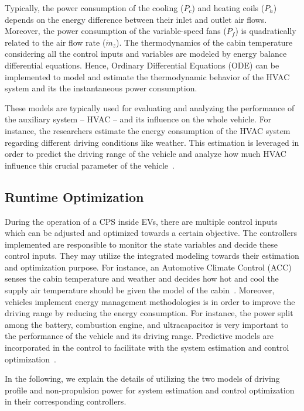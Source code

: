 Typically, the power consumption of the cooling ($P_c$) and heating coils ($P_h$) depends on the energy difference between their inlet and outlet air flows. Moreover, the power consumption of the variable-speed fans ($P_f$) is quadratically related to the air flow rate ($\dot{m}_z$). The thermodynamics of the cabin temperature considering all the control inputs and variables are modeled by energy balance differential equations. Hence, Ordinary Differential Equations (ODE) can be implemented to model and estimate the thermodynamic behavior of the HVAC system and its the instantaneous power consumption. 

These models are typically used for evaluating and analyzing the performance of the auxiliary system – HVAC – and its influence on the whole vehicle. For instance, the researchers estimate the energy consumption of the HVAC system regarding different driving conditions like weather. This estimation is leveraged in order to predict the driving range of the vehicle and analyze how much HVAC influence this crucial parameter of the vehicle~\cite{AF_23,AF_28,AF_29}. 

\subsection{Runtime Optimization}

During the operation of a CPS inside EVs, there are multiple control inputs which can be adjusted and optimized towards a certain objective. The controllers implemented are responsible to monitor the state variables and decide these control inputs. They may utilize the integrated modeling towards their estimation and optimization purpose. For instance, an Automotive Climate Control (ACC) senses the cabin temperature and weather and decides how hot and cool the supply air temperature should be given the model of the cabin~\cite{AF_30,AF_31,AF_32,AF_33}. Moreover, vehicles implement energy management methodologies is in order to improve the driving range by reducing the energy consumption.  For instance, the power split among the battery, combustion engine, and ultracapacitor is very important to the performance of the vehicle and its driving range. Predictive models are incorporated in the control to facilitate with the system estimation and control optimization~\cite{Park:DAC13,AF_10,AF_34,AF_35,AF_36}.

In the following, we explain the details of utilizing the two models of driving profile and non-propulsion power for system estimation and control optimization in their corresponding controllers.

